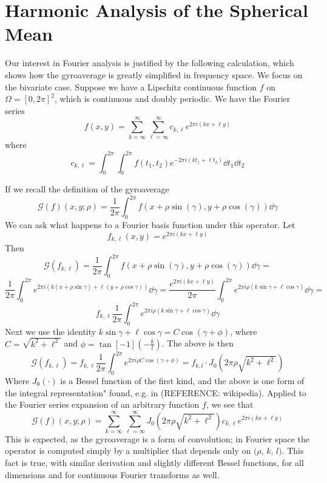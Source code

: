 \section{Harmonic Analysis of the Spherical Mean \label{sec:Harmonic2}}
Our interest in Fourier analysis is justified by the following calculation, which shows how the gyroaverage is greatly simplified in frequency space.  We focus on the bivariate case.  Suppose we have a Lipschitz continuous function $f$ on $\Omega = [0,2\pi]^2$, which is continuous and doubly periodic.  We have the Fourier series
\[ f(x,y) = \sum_{k=\infty}^{\infty} \sum_{\ell = \infty}^{\infty} c_{k,\ell} e^{2 \pi i (kx+\ell y)}  \]
where
\[ c_{k,\ell} = \int_{0}^{2 \pi} \int_{0}^{2 \pi} f(t_1,t_2) e^{-2 \pi i (kt_1 + \ell t_2)} \dd{t_1} \dd{t_2}\]

If we recall the definition of the gyroaverage
\[ \mathcal{G}(f)(x,y;\rho) = \frac{1}{2 \pi}\int_{0}^{2\pi} f(x+\rho \sin(\gamma), y + \rho \cos(\gamma)) \dd{\gamma}\]
We can ask what happens to a Fourier basis function under this operator.  Let
\[ f_{k, \ell} (x,y) = e^{2 \pi i (kx+\ell y)}   \]
Then
\[ \mathcal{G}(f_{k,\ell}) = \frac{1}{2 \pi}  \int_{0}^{2\pi} f(x+\rho \sin(\gamma), y + \rho \cos(\gamma)) \dd{\gamma} =  \]
\[  \frac{1}{2 \pi}  \int_{0}^{2\pi} e^{2 \pi i (k(x + \rho \sin \gamma) + \ell(y + \rho \cos \gamma))} \dd{\gamma} =   \frac{e^{2 \pi i (kx + \ell y)}}{2 \pi}\int_{0}^{2\pi} e^{2 \pi i \rho (k \sin \gamma + \ell \cos \gamma)} \dd{\gamma} =   \]
\[ f_{k,\ell} \frac{1}{2 \pi}\int_{0}^{2\pi} e^{2 \pi i \rho (k \sin \gamma + \ell \cos \gamma)} \dd{\gamma} \]
Next we use the identity $k \sin \gamma + \ell \cos \gamma = C \cos (\gamma + \phi)$, where $C = \sqrt{k^2 + \ell^2}$ and $\phi = \tan[-1](-\frac{k}{l})$.  The above is then 
\[ \mathcal{G}(f_{k,\ell}) = f_{k,\ell} \frac{1}{2 \pi} \int_{0}^{2 \pi} e^{2 \pi i \rho C \cos(\gamma + \phi)} = f_{k,l}  \cdot J_0(2 \pi \rho \sqrt{k^2 + \ell^2}) \]
Where $J_0(\cdot)$ is a Bessel function of the first kind, and the above is one form of the integral representation" found, e.g. in (REFERENCE: wikipedia). 
Applied to the Fourier series expansion of an arbitrary function $f$, we see that
\[\mathcal{G}(f)(x,y;\rho) = \sum_{k=\infty}^{\infty} \sum_{\ell = \infty}^{\infty}  J_0(2 \pi \rho \sqrt{k^2 + \ell^2}) c_{k,\ell} e^{2 \pi i (kx+\ell y)}   \] 
This is expected, as the gyroaverage is a form of convolution; in Fourier space the operator is computed simply by a multiplier that depends only on $(\rho$, $k$, $l)$.  This fact is true, with similar derivation and slightly different Bessel functions, for all dimensions and for continuous Fourier transforms as well.

